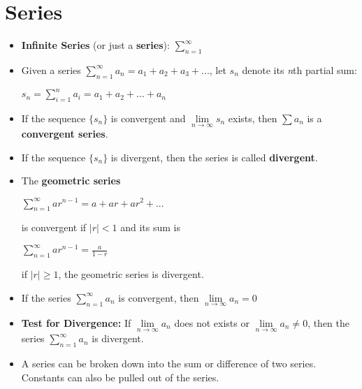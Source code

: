 \documentclass{report}
\begin{document}
	\section{Series}
		\begin{itemize}\addtolength{\leftskip}{2em}
			\item \textbf{Infinite Series} (or just a \textbf{series}): $\sum\limits_{n=1}^{\infty}$
			\item Given a series $\sum\limits_{n=1}^{\infty}a_n=a_1+a_2+a_3+...$, let $s_n$ denote its \textit{n}th partial sum:
			\begin{center}
			\large$s_n=\sum\limits_{i=1}^{n}a_i=a_1+a_2+...+a_n$
			\end{center}
			\item If the sequence $\{s_n\}$ is convergent and $\lim\limits_{n\rightarrow \infty}s_n$ exists, then $\sum a_n$ is a \textbf{convergent series}.
			\item If the sequence  $\{s_n\}$ is divergent, then the series is called \textbf{divergent}.
			\item The \textbf{geometric series}
			\begin{center}
			\large$\sum\limits_{n=1}^{\infty}ar^{n-1}=a+ar+ar^2+...$
			\end{center}
			\begin{center}
			is convergent if $|r|<1$ and its sum is 
			\end{center}
			\begin{center}
			\large$\sum\limits_{n=1}^{\infty}ar^{n-1}=\frac{a}{1-r}$
			\end{center}
			\begin{center}
			if $|r|\ge 1$, the geometric series is divergent.
			\end{center}
			\item If the series $\sum\limits_{n=1}^{\infty}a_n$ is convergent, then $\lim\limits_{n\rightarrow \infty}a_n=0$
			\item \textbf{Test for Divergence: }If $\lim\limits_{n\rightarrow \infty}a_n$ does not exists or $\lim\limits_{n\rightarrow \infty}a_n\ne 0$, then the series $\sum\limits_{n=1}^{\infty}a_n$ is divergent.
			\item A series can be broken down into the sum or difference of two series. Constants can also be pulled out of the series.

		\end{itemize}
\end{document}
